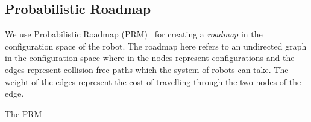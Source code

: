 \documentclass[12pt,a4paper, onecolumn]{IEEEtran}
\begin{document}
\subsection{Probabilistic Roadmap}
We use Probabilistic Roadmap (PRM)~\cite{kavrakiSLO96} for creating a {\em roadmap} in the configuration space of the robot. 
The roadmap here refers to an undirected graph in the configuration space where in the nodes represent configurations and the edges represent collision-free paths which the system of robots can take. 
The weight of the edges represent the cost of travelling through the two nodes of the edge. 

The PRM 



\end{document}
